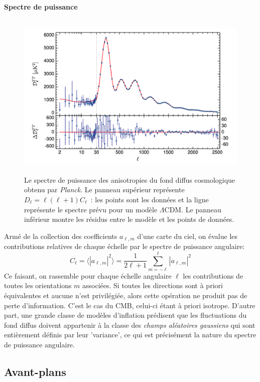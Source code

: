 \paragraph{Spectre de puissance}
\begin{figure}[htbp]
	\centering
		\includegraphics[height=8cm]{figs/cl2015.png}
		\caption{Le spectre de puissance des anisotropies du fond diffus cosmologique obtenu par \textit{Planck}. Le panneau supérieur représente $D_\ell=\ell(\ell+1)C_\ell$~: les points sont les données et la ligne représente le spectre prévu pour un modèle $\Lambda$CDM. Le panneau inférieur montre les résidus entre le modèle et les points de données.}
	\label{f:cl}
\end{figure}

Armé de la collection des coefficients $a_{\ell,m}$ d'une carte du ciel, on évalue les contributions relatives de chaque échelle par le spectre de puissance angulaire:
\begin{equation}
C_\ell=\langle |a_{\ell,m}|^2\rangle=\frac{1}{2\ell+1}\sum_{m=-\ell}^{\ell} |a_{\ell,m}|^2
\end{equation}
Ce faisant, on rassemble pour chaque échelle angulaire $\ell$ les contributions de toutes les orientations $m$ associées. Si toutes les directions sont à priori équivalentes et aucune n'est privilégiée, alors cette opération ne produit pas de perte d'information. C'est le cas du CMB, celui-ci étant à priori isotrope. D'autre part, une grande classe de modèles d'inflation prédisent que les fluctuations du fond diffus doivent appartenir à la classe des \textit{champs aléatoires gaussiens} qui sont entièrement définis par leur 'variance', ce qui est précisément la nature du spectre de puissance angulaire.

\subsection{Avant-plans}

